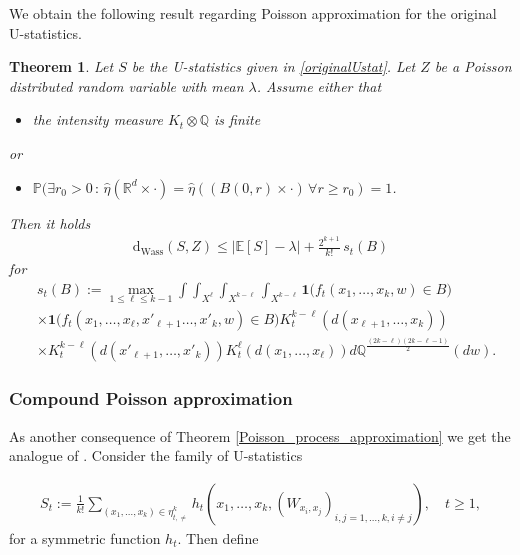 \documentclass{article}
\newtheorem{theorem}{Theorem}[section]
\theoremstyle{definition}
\numberwithin{equation}{section}
\theoremstyle{remark}
\begin{document}
We obtain the following result regarding Poisson approximation for the original U-statistics.

\begin{theorem} \label{P1}
    Let $S$ be the U-statistics given in \eqref{originalUstat}. Let $Z$ be a Poisson distributed random variable with mean $\lambda$. Assume either that
    \begin{itemize}
        \item[(i)] the intensity measure $K_t \otimes \mathbb{Q}$ is finite
    \end{itemize}
    or
    \begin{itemize}
        \item[(ii)] $\mathbb{P} (\exists r_0>0 \,: \, \hat{\eta}( \mathbb{R}^d \times \cdot) = \hat{\eta}( (B(0,r) \times \cdot) \, \forall r \geq r_0 ) = 1$.
    \end{itemize}
    Then it holds
    \begin{align*}
	    \mathrm{d}_{\mathrm{Wass}}({S}, Z) \leq \left| \mathbb{E}[{S}] - \lambda \right| + \frac{2^{k+1}}{k!} \, s_t(B)
    \end{align*}
for
\begin{align*}
  &  s_t(B) := \max_{1 \leq \ell \leq k-1} 
\int \int_{X^\ell}  
\int_{X^{k - \ell}}\int_{X^{k - \ell}} \mathbf{1}\big( {f}_t ( {x}_1, \ldots, {x}_k , w ) \in B \big)  \\
&  \times \mathbf{1}\big( {f}_t ( {x}_1, \ldots, {x}_\ell, {x}'_{\ell+1} \ldots, {x}'_{k}, w ) \in B \big){K}_t^{k - \ell}(d({x}_{\ell+1}, \ldots, {x}_k)) \\
&  \times  {K}_t^{k - \ell}(d({x}'_{\ell+1}, \ldots, {x}'_k)) {K}_t^\ell(d({x}_1, \ldots, {x}_\ell)) d\mathbb{Q}^{\frac{(2k - \ell) (2k -\ell-1)}{2}} (dw) .
\end{align*}
  
\end{theorem}




\subsubsection{Compound Poisson approximation}

As another consequence of Theorem \ref{Poisson_process_approximation} we get the analogue of \cite[Theorem 7.4]{dst}. Consider the family of U-statistics

\begin{align*}
S_t := \frac{1}{k!} \sum_{(x_1, \ldots, x_k) \in \eta_{t,\neq}^k} h_t(x_1, \ldots, x_k, (W_{x_i,x_j})_{i,j =1,\ldots, k, i \neq j}), \quad t \ge 1,
\end{align*}
for a symmetric function $h_t$. Then define
\end{document}
